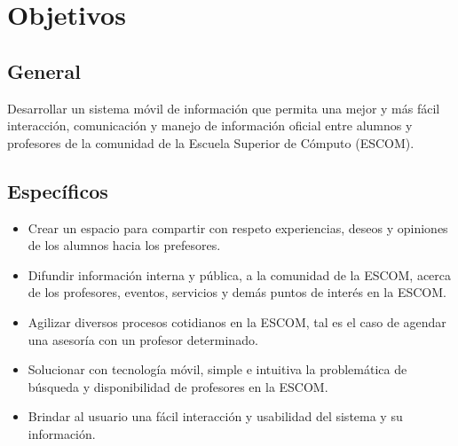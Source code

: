 \section{Objetivos}

\subsection{General}

Desarrollar un sistema móvil de información que permita una mejor y más fácil interacción, comunicación y manejo de información oficial entre alumnos y profesores de la comunidad de la Escuela Superior de Cómputo (ESCOM).

\subsection{Específicos}
	\begin{itemize}

		\item Crear un espacio para compartir con respeto experiencias, deseos y opiniones de los alumnos hacia los prefesores.%
		\item Difundir información interna y pública, a la comunidad de la ESCOM, acerca de los profesores, eventos, servicios y demás puntos de interés en la ESCOM. 
		\item Agilizar diversos procesos cotidianos en la ESCOM, tal es el caso de agendar una asesoría con un profesor determinado. 
		\item Solucionar con tecnología móvil, simple e intuitiva la problemática de búsqueda y disponibilidad de profesores en la ESCOM. 
		\item Brindar al usuario una fácil interacción y usabilidad del sistema y su información.
	\end{itemize}